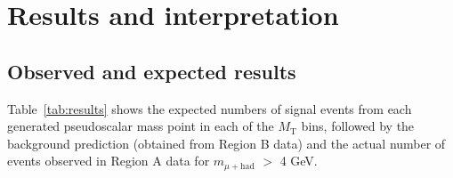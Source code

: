 \chapter{Results and interpretation\label{sec:results}}

\section{Observed and expected results\label{sec:results-obsexp}}

Table~\ref{tab:results} shows the expected numbers of signal events from each generated pseudoscalar mass point in each of the $M_{\text{T}}$ bins, followed by the background prediction (obtained from Region B data) and the actual number of events observed in Region A data for $m_{\mu+\text{had}}$ $>$ 4 GeV.

